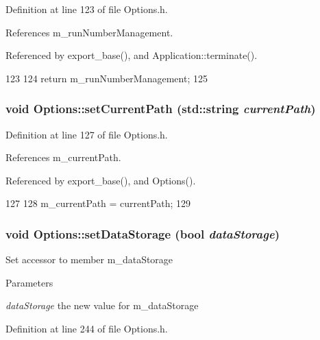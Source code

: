 Definition at line 123 of file Options.h.

References m\_\-runNumberManagement.

Referenced by export\_\-base(), and Application::terminate().


\begin{DoxyCode}
123                                     {
124                 return m_runNumberManagement;
125         }
\end{DoxyCode}
\hypertarget{classOptions_a3cebd8308183414ef2e0de0e7922c87a}{
\subsubsection[{setCurrentPath}]{\setlength{\rightskip}{0pt plus 5cm}void Options::setCurrentPath (std::string {\em currentPath})}}
\label{classOptions_a3cebd8308183414ef2e0de0e7922c87a}


Definition at line 127 of file Options.h.

References m\_\-currentPath.

Referenced by export\_\-base(), and Options().


\begin{DoxyCode}
127                                                     {
128                 m_currentPath = currentPath;
129         }
\end{DoxyCode}
\hypertarget{classOptions_ae6f39f4b0b4bd260fbb5a2f0b5f4786e}{
\subsubsection[{setDataStorage}]{\setlength{\rightskip}{0pt plus 5cm}void Options::setDataStorage (bool {\em dataStorage})}}
\label{classOptions_ae6f39f4b0b4bd260fbb5a2f0b5f4786e}
Set accessor to member m\_\-dataStorage 
\begin{DoxyParams}{Parameters}
\item[{\em dataStorage}]the new value for m\_\-dataStorage \end{DoxyParams}


Definition at line 244 of file Options.h.

